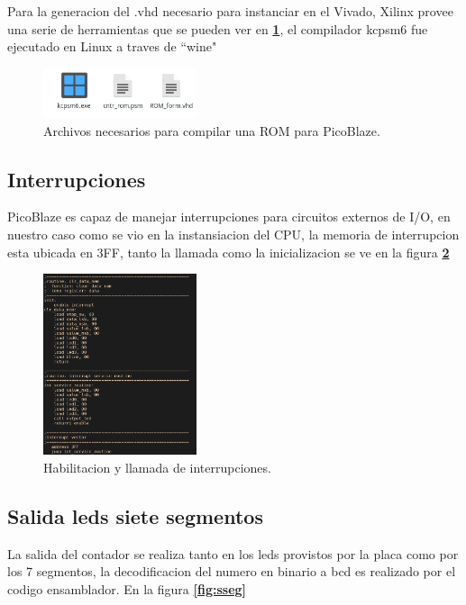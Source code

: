 \documentclass[11pt, a4paper]{article}
\begin{document}
	Para la generacion del .vhd necesario para instanciar en el Vivado, Xilinx provee una serie de herramientas que se pueden ver en \textcolor{blue}{\textbf{\ref{fig:tools}}}, el compilador kcpsm6 fue ejecutado en Linux a traves de ``wine"

		\begin{figure}[H]
			\centering
			\includegraphics[width=0.4\textwidth]{Imagenes/tools.png}
			\caption{Archivos necesarios para compilar una ROM para PicoBlaze.}
			\label{fig:tools}
		\end{figure} 
		
	
	\subsection{Interrupciones}
	PicoBlaze es capaz de manejar interrupciones para circuitos externos de I/O, en nuestro caso como se vio en la instansiacion del CPU, la memoria de interrupcion esta ubicada en 3FF, tanto la llamada como la inicializacion se ve en la figura \textcolor{blue}{\textbf{\ref{fig:isr}}}

		\begin{figure}[H]
			\centering
			\includegraphics[width=0.4\textwidth]{Imagenes/isr.png}
			\caption{Habilitacion y llamada de interrupciones.}
			\label{fig:isr}
		\end{figure} 


\clearpage
	\subsection{Salida leds siete segmentos}
	La salida del contador se realiza tanto en los leds provistos por la placa como por los 7 segmentos, la decodificacion del numero en binario a bcd es realizado por el codigo ensamblador. En la figura \textcolor{blue}{\textbf{\ref{fig:sseg}}}
 
\end{document}
